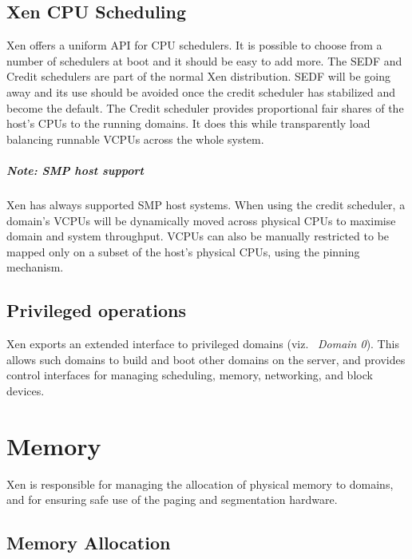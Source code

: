 \documentclass[11pt,twoside,final,openright]{report}
\begin{document}
\section{Xen CPU Scheduling}

Xen offers a uniform API for CPU schedulers.  It is possible to choose
from a number of schedulers at boot and it should be easy to add more.
The SEDF and Credit schedulers are part of the normal Xen
distribution.  SEDF will be going away and its use should be
avoided once the credit scheduler has stabilized and become the default.
The Credit scheduler provides proportional fair shares of the
host's CPUs to the running domains. It does this while transparently
load balancing runnable VCPUs across the whole system.

\paragraph*{Note: SMP host support}
Xen has always supported SMP host systems. When using the credit scheduler,
a domain's VCPUs will be dynamically moved across physical CPUs to maximise
domain and system throughput. VCPUs can also be manually restricted to be
mapped only on a subset of the host's physical CPUs, using the pinning
mechanism.




\section{Privileged operations}

Xen exports an extended interface to privileged domains (viz.\ {\it
  Domain 0}). This allows such domains to build and boot other domains
on the server, and provides control interfaces for managing
scheduling, memory, networking, and block devices.

\chapter{Memory}
\label{c:memory} 

Xen is responsible for managing the allocation of physical memory to
domains, and for ensuring safe use of the paging and segmentation
hardware.


\section{Memory Allocation}
\end{document}
